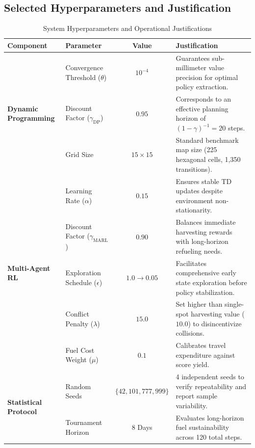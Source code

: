 \documentclass[11pt,a4paper]{article}
\begin{document}
\subsection{Selected Hyperparameters and Justification}
\begin{table}[htbp]
\centering
\small
\caption{System Hyperparameters and Operational Justifications}
\label{tab:hyperparams}
\begin{tabularx}{\textwidth}{llcX}
\toprule
\textbf{Component} & \textbf{Parameter} & \textbf{Value} & \textbf{Justification} \\
\midrule
\multirow{3}{*}{\textbf{Dynamic Programming}} 
& Convergence Threshold ($\theta$) & $10^{-4}$ & Guarantees sub-millimeter value precision for optimal policy extraction. \\
& Discount Factor ($\gamma_{\text{DP}}$) & $0.95$ & Corresponds to an effective planning horizon of $(1-\gamma)^{-1} = 20$ steps. \\
& Grid Size & $15 \times 15$ & Standard benchmark map size (225 hexagonal cells, 1,350 transitions). \\
\midrule
\multirow{5}{*}{\textbf{Multi-Agent RL}} 
& Learning Rate ($\alpha$) & $0.15$ & Ensures stable TD updates despite environment non-stationarity. \\
& Discount Factor ($\gamma_{\text{MARL}}$) & $0.90$ & Balances immediate harvesting rewards with long-horizon refueling needs. \\
& Exploration Schedule ($\epsilon$) & $1.0 \to 0.05$ & Facilitates comprehensive early state exploration before policy stabilization. \\
& Conflict Penalty ($\lambda$) & $15.0$ & Set higher than single-spot harvesting value ($10.0$) to disincentivize collisions. \\
& Fuel Cost Weight ($\mu$) & $0.1$ & Calibrates travel expenditure against score yield. \\
\midrule
\multirow{2}{*}{\textbf{Statistical Protocol}} 
& Random Seeds & $\{42, 101, 777, 999\}$ & 4 independent seeds to verify repeatability and report sample variability. \\
& Tournament Horizon & 8 Days & Evaluates long-horizon fuel sustainability across 120 total steps. \\
\bottomrule
\end{tabularx}
\end{table}
\end{document}
